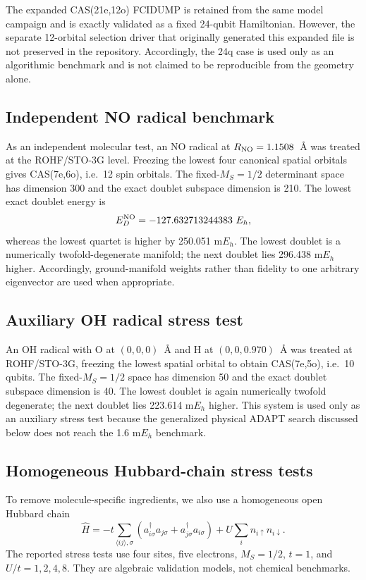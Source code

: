 \documentclass[
 aip,
 jcp,
 amsmath,amssymb,
 preprint
]{revtex4-2}
\begin{document}
The expanded CAS(21e,12o) FCIDUMP is retained from the same model campaign and is exactly validated as a fixed 24-qubit Hamiltonian.
However, the separate 12-orbital selection driver that originally generated this expanded file is not preserved in the repository.
Accordingly, the 24q case is used only as an algorithmic benchmark and is not claimed to be reproducible from the geometry alone.

\subsection{Independent NO radical benchmark}

As an independent molecular test, an NO radical at $R_{\rm NO}=1.1508$~\AA{} was treated at the ROHF/STO-3G level.
Freezing the lowest four canonical spatial orbitals gives CAS(7e,6o), i.e.\ 12 spin orbitals.
The fixed-$M_S=1/2$ determinant space has dimension 300 and the exact doublet subspace dimension is 210.
The lowest exact doublet energy is
\begin{equation}
E_D^{\rm NO}=-127.632713244383~E_h,
\end{equation}
whereas the lowest quartet is higher by 250.051 m$E_h$.
The lowest doublet is a numerically twofold-degenerate manifold; the next doublet lies 296.438 m$E_h$ higher.
Accordingly, ground-manifold weights rather than fidelity to one arbitrary eigenvector are used when appropriate.

\subsection{Auxiliary OH radical stress test}

An OH radical with O at $(0,0,0)$~\AA{} and H at $(0,0,0.970)$~\AA{} was treated at ROHF/STO-3G, freezing the lowest spatial orbital to obtain CAS(7e,5o), i.e.\ 10 qubits.
The fixed-$M_S=1/2$ space has dimension 50 and the exact doublet subspace dimension is 40.
The lowest doublet is again numerically twofold degenerate; the next doublet lies 223.614 m$E_h$ higher.
This system is used only as an auxiliary stress test because the generalized physical ADAPT search discussed below does not reach the 1.6 m$E_h$ benchmark.

\subsection{Homogeneous Hubbard-chain stress tests}

To remove molecule-specific ingredients, we also use a homogeneous open Hubbard chain
\begin{equation}
\hat H
=
-t\sum_{\langle ij\rangle,\sigma}
\left(
a_{i\sigma}^\dagger a_{j\sigma}
+a_{j\sigma}^\dagger a_{i\sigma}
\right)
+
U\sum_i n_{i\uparrow}n_{i\downarrow}.
\end{equation}
The reported stress tests use four sites, five electrons, $M_S=1/2$, $t=1$, and
$U/t=1,2,4,8$.
They are algebraic validation models, not chemical benchmarks.
\end{document}
